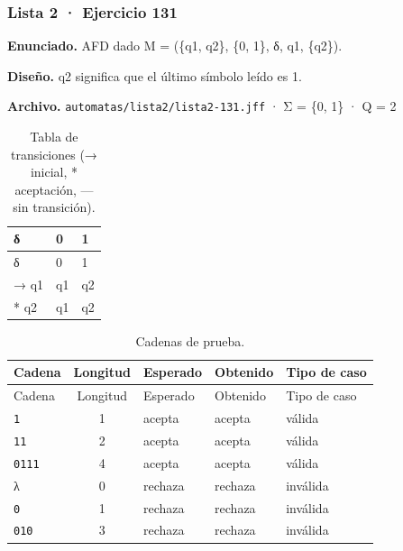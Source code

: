 
\hypertarget{lista-2-ejercicio-131}{%
\subsubsection{Lista 2 · Ejercicio 131}\label{lista-2-ejercicio-131}}

\textbf{Enunciado.} AFD dado M = (\{q1, q2\}, \{0, 1\}, δ, q1, \{q2\}).

\textbf{Diseño.} q2 significa que el último símbolo leído es 1.

\textbf{Archivo.} \texttt{automatas/lista2/lista2-131.jff} · Σ = \{0, 1\} · \textbar Q\textbar{} = 2

\begin{longtable}[]{@{}lll@{}}
\caption{Tabla de transiciones (→ inicial, * aceptación, --- sin transición).}\tabularnewline
\toprule\noalign{}
δ & 0 & 1 \\
\midrule\noalign{}
\endfirsthead
\toprule\noalign{}
δ & 0 & 1 \\
\midrule\noalign{}
\endhead
\bottomrule\noalign{}
\endlastfoot
→ q1 & q1 & q2 \\
* q2 & q1 & q2 \\
\end{longtable}

\begin{longtable}[]{@{}lclll@{}}
\caption{Cadenas de prueba.}\tabularnewline
\toprule\noalign{}
Cadena & Longitud & Esperado & Obtenido & Tipo de caso \\
\midrule\noalign{}
\endfirsthead
\toprule\noalign{}
Cadena & Longitud & Esperado & Obtenido & Tipo de caso \\
\midrule\noalign{}
\endhead
\bottomrule\noalign{}
\endlastfoot
\texttt{1} & 1 & acepta & acepta & válida \\
\texttt{11} & 2 & acepta & acepta & válida \\
\texttt{0111} & 4 & acepta & acepta & válida \\
λ & 0 & rechaza & rechaza & inválida \\
\texttt{0} & 1 & rechaza & rechaza & inválida \\
\texttt{010} & 3 & rechaza & rechaza & inválida \\
\end{longtable}


